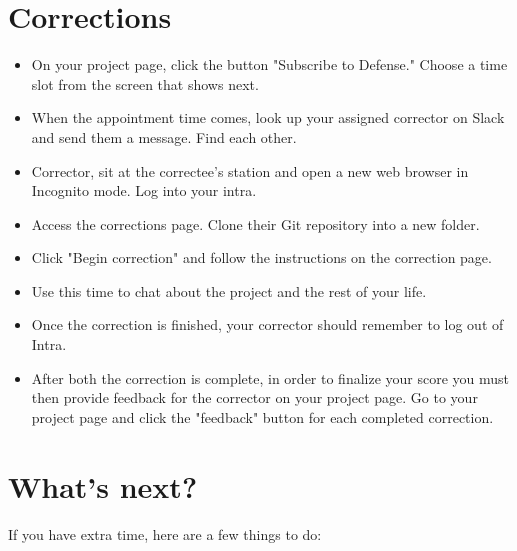 \documentclass{42-en}
\begin{document}
\chapter{Corrections}
\begin{itemize}
	\item On your project page, click the button "Subscribe to Defense." Choose a time slot from the screen that shows next.

	\item When the appointment time comes, look up your assigned corrector on Slack and send them a message. Find each other.

	\item Corrector, sit at the correctee's station and open a new web browser in Incognito mode. Log into your intra.

	\item Access the corrections page. Clone their Git repository into a new folder.

	\item Click "Begin correction" and follow the instructions on the correction page.

	\item Use this time to chat about the project and the rest of your life.

	\item Once the correction is finished, your corrector should remember to log out of Intra.

	\item After both the correction is complete, in order to finalize your score you must then provide feedback for the corrector on your project page. Go to your project page and click the "feedback" button for each completed correction.

\end{itemize}


\chapter{What's next?}

If you have extra time, here are a few things to do:
\end{document}
